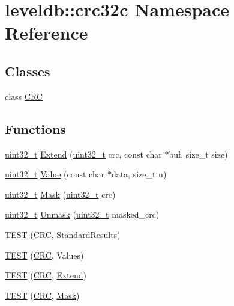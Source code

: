 \hypertarget{namespaceleveldb_1_1crc32c}{}\section{leveldb\+:\+:crc32c Namespace Reference}
\label{namespaceleveldb_1_1crc32c}
\subsection*{Classes}
\begin{DoxyCompactItemize}
\item 
class \hyperlink{classleveldb_1_1crc32c_1_1_c_r_c}{C\+R\+C}
\end{DoxyCompactItemize}
\subsection*{Functions}
\begin{DoxyCompactItemize}
\item 
\hyperlink{stdint_8h_a435d1572bf3f880d55459d9805097f62}{uint32\+\_\+t} \hyperlink{namespaceleveldb_1_1crc32c_ac42fd0618afe635356d722fd29f5ff10}{Extend} (\hyperlink{stdint_8h_a435d1572bf3f880d55459d9805097f62}{uint32\+\_\+t} crc, const char $\ast$buf, size\+\_\+t size)
\item 
\hyperlink{stdint_8h_a435d1572bf3f880d55459d9805097f62}{uint32\+\_\+t} \hyperlink{namespaceleveldb_1_1crc32c_ac004d1e3d8c75b033c162e5ae0a5cc2c}{Value} (const char $\ast$data, size\+\_\+t n)
\item 
\hyperlink{stdint_8h_a435d1572bf3f880d55459d9805097f62}{uint32\+\_\+t} \hyperlink{namespaceleveldb_1_1crc32c_a3790e1e939714a29609e46383aafd6cf}{Mask} (\hyperlink{stdint_8h_a435d1572bf3f880d55459d9805097f62}{uint32\+\_\+t} crc)
\item 
\hyperlink{stdint_8h_a435d1572bf3f880d55459d9805097f62}{uint32\+\_\+t} \hyperlink{namespaceleveldb_1_1crc32c_aef7889069ea26dd145509fff4c4e6b66}{Unmask} (\hyperlink{stdint_8h_a435d1572bf3f880d55459d9805097f62}{uint32\+\_\+t} masked\+\_\+crc)
\item 
\hyperlink{namespaceleveldb_1_1crc32c_a2ef79d6b85c2866295c1573ea6e62a52}{T\+E\+S\+T} (\hyperlink{classleveldb_1_1crc32c_1_1_c_r_c}{C\+R\+C}, Standard\+Results)
\item 
\hyperlink{namespaceleveldb_1_1crc32c_aeca842cf29e5136e1594dd5e0a714d7f}{T\+E\+S\+T} (\hyperlink{classleveldb_1_1crc32c_1_1_c_r_c}{C\+R\+C}, Values)
\item 
\hyperlink{namespaceleveldb_1_1crc32c_aec2f6fd8802f5c6473281a2400301fa4}{T\+E\+S\+T} (\hyperlink{classleveldb_1_1crc32c_1_1_c_r_c}{C\+R\+C}, \hyperlink{namespaceleveldb_1_1crc32c_ac42fd0618afe635356d722fd29f5ff10}{Extend})
\item 
\hyperlink{namespaceleveldb_1_1crc32c_aeae3dd6a190a86fb295e1232715e2b23}{T\+E\+S\+T} (\hyperlink{classleveldb_1_1crc32c_1_1_c_r_c}{C\+R\+C}, \hyperlink{namespaceleveldb_1_1crc32c_a3790e1e939714a29609e46383aafd6cf}{Mask})
\end{DoxyCompactItemize}


